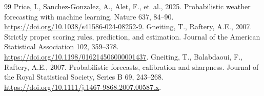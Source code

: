 \documentclass[preprint,12pt,authoryear]{elsarticle}
\begin{document}
\begin{thebibliography}{99}
 Price, I., Sanchez-Gonzalez, A., Alet, F., et~al., 2025. Probabilistic weather forecasting with machine learning. Nature 637, 84--90. \url{https://doi.org/10.1038/s41586-024-08252-9}.
 Gneiting, T., Raftery, A.E., 2007. Strictly proper scoring rules, prediction, and estimation. Journal of the American Statistical Association 102, 359--378. \url{https://doi.org/10.1198/016214506000001437}.
 Gneiting, T., Balabdaoui, F., Raftery, A.E., 2007. Probabilistic forecasts, calibration and sharpness. Journal of the Royal Statistical Society, Series B 69, 243--268. \url{https://doi.org/10.1111/j.1467-9868.2007.00587.x}.
\end{thebibliography}
\endgroup
\end{document}
